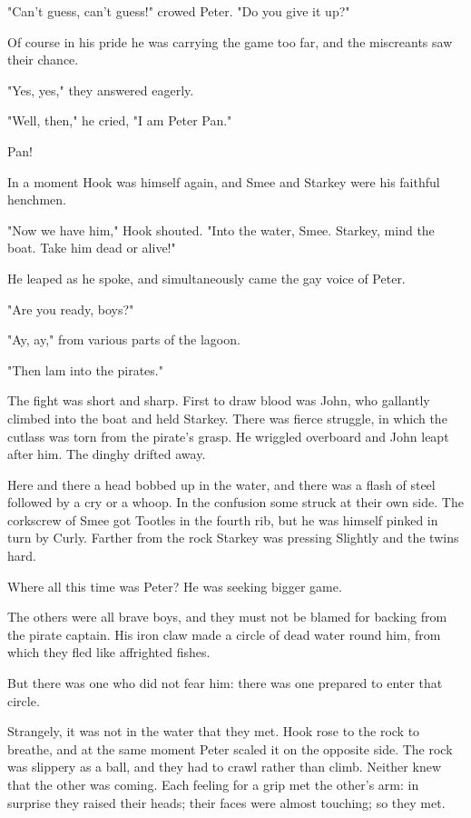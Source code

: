 "Can't guess, can't guess!\@" crowed Peter.
"Do you give it up?"

Of course in his pride he was carrying the game too far, and the miscreants saw their chance.

"Yes, yes," they answered eagerly.

"Well, then," he cried, "I am Peter Pan."

Pan!

In a moment Hook was himself again, and Smee and Starkey were his faithful henchmen.

"Now we have him," Hook shouted.
"Into the water, Smee.
Starkey, mind the boat.
Take him dead or alive!"

He leaped as he spoke, and simultaneously came the gay voice of Peter.

"Are you ready, boys?"

"Ay, ay," from various parts of the lagoon.

"Then lam into the pirates."

The fight was short and sharp.
First to draw blood was John, who gallantly climbed into the boat and held Starkey.
There was fierce struggle, in which the cutlass was torn from the pirate's grasp.
He wriggled overboard and John leapt after him.
The dinghy drifted away.

Here and there a head bobbed up in the water, and there was a flash of steel followed by a cry or a whoop.
In the confusion some struck at their own side.
The corkscrew of Smee got Tootles in the fourth rib, but he was himself pinked in turn by Curly.
Farther from the rock Starkey was pressing Slightly and the twins hard.

Where all this time was Peter?
He was seeking bigger game.

The others were all brave boys, and they must not be blamed for backing from the pirate captain.
His iron claw made a circle of dead water round him, from which they fled like affrighted fishes.

But there was one who did not fear him:
there was one prepared to enter that circle.

Strangely, it was not in the water that they met.
Hook rose to the rock to breathe, and at the same moment Peter scaled it on the opposite side.
The rock was slippery as a ball, and they had to crawl rather than climb.
Neither knew that the other was coming.
Each feeling for a grip met the other's arm:
in surprise they raised their heads;
their faces were almost touching;
so they met.

